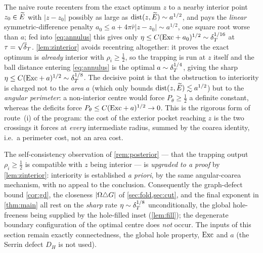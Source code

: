 \begin{remark}
\label{rem:zinE}
The naive route recenters from the exact optimum $z$ to a nearby interior
point $z_0\in\widetilde{E}$ with $|z-z_0|$ possibly as large as $\operatorname{dist}(z,\widetilde{E})\sim
a^{1/2}$, and pays the \emph{linear} symmetric-difference penalty
$a_0\le a+4\pi\hat r|z-z_0|\sim a^{1/2}$, one square root worse than $a$;
fed into \eqref{eq:annulus} this gives only $\eta\le C(\mathrm{Exc}+a_0)^{1/2}\sim
\delta_T^{1/16}$ at $\tau=\sqrt\dT$. \cref{lem:zinterior} avoids recentring
altogether: it proves the exact optimum is \emph{already} interior with
$\rho_i\ge\tfrac12$, so the trapping is run at $z$ itself and the ball
distance entering \eqref{eq:annulus} is the optimal $a\sim\delta_T^{1/4}$, giving
the sharp $\eta\le C(\mathrm{Exc}+a)^{1/2}\sim\delta_T^{1/8}$. The decisive point is that
the obstruction to interiority is charged not to the \emph{area} $a$ (which
only bounds $\operatorname{dist}(z,\widetilde{E})\lesssim a^{1/2}$) but to the \emph{angular
perimeter}: a non-interior centre would force $P_\theta\ge\tfrac12$ a definite
constant, whereas the deficits force $P_\theta\le C(\mathrm{Exc}+a)^{1/2}\to0$. This
is the rigorous form of route~(i) of the program: the cost of the exterior
pocket reaching $z$ is the two crossings it forces at \emph{every}
intermediate radius, summed by the coarea identity, i.e.\ a perimeter cost,
not an area cost.
\end{remark}

\begin{remark}\label{rem:zinE-gap}
The self-consistency observation of \cref{rem:posterior} --- that the trapping
output $\rho_i\ge\tfrac12$ is compatible with $z$ being interior --- is
\emph{upgraded to a proof} by \cref{lem:zinterior}: interiority is established
\emph{a priori}, by the same angular-coarea mechanism, with no appeal to the
conclusion. Consequently the graph-defect bound \cref{cor:gd}, the closeness
$|\Omega\triangle G|$ of \cref{sec:fold,sec:cut}, and the final exponent in
\cref{thm:main} all rest on the \emph{sharp} rate $\eta\sim\delta_T^{1/8}$
unconditionally, the global hole-freeness being supplied by the hole-filled
inset (\cref{lem:fill}); the degenerate boundary configuration of the optimal
centre does \emph{not} occur.
The inputs of this section remain exactly connectedness, the global hole
property, $\mathrm{Exc}$ and $a$ (the Serrin defect $D_H$ is not used).
\end{remark}


